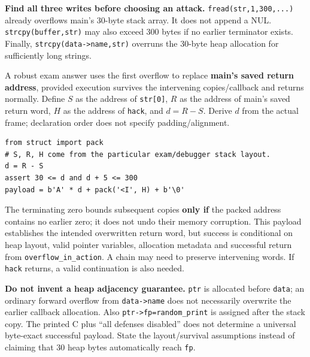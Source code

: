 \documentclass[11pt,a4paper]{article}
\begin{document}
\textbf{Find all three writes before choosing an attack.} \texttt{fread(str,\allowbreak{}1,\allowbreak{}300,\allowbreak{}...)} already overflows main's 30-byte stack array. It does not append a NUL. \texttt{strcpy(buffer,\allowbreak{}str)} may also exceed 300 bytes if no earlier terminator exists. Finally,\allowbreak{} \texttt{strcpy(data->name,\allowbreak{}str)} overruns the 30-byte heap allocation for sufficiently long strings.


A robust exam answer uses the first overflow to replace \textbf{main's saved return address},\allowbreak{} provided execution survives the intervening copies/\allowbreak{}callback and returns normally. Define \(S\) as the address of \texttt{str[0]},\allowbreak{} \(R\) as the address of main's saved return word,\allowbreak{} \(H\) as the address of \texttt{hack},\allowbreak{} and \(d=R-S\). Derive \(d\) from the actual frame; declaration order does not specify padding/\allowbreak{}alignment.



\begin{Verbatim}[breaklines=true,breakanywhere=true,fontsize=\small,frame=single,rulecolor=\color{PanelBorder}]
from struct import pack
# S, R, H come from the particular exam/debugger stack layout.
d = R - S
assert 30 <= d and d + 5 <= 300
payload = b'A' * d + pack('<I', H) + b'\0'
\end{Verbatim}

The terminating zero bounds subsequent copies \textbf{only if} the packed address contains no earlier zero; it does not undo their memory corruption. This payload establishes the intended overwritten return word,\allowbreak{} but success is conditional on heap layout,\allowbreak{} valid pointer variables,\allowbreak{} allocation metadata and successful return from \texttt{overflow\_in\_action}. A chain may need to preserve intervening words. If \texttt{hack} returns,\allowbreak{} a valid continuation is also needed.


\textbf{Do not invent a heap adjacency guarantee.} \texttt{ptr} is allocated before \texttt{data}; an ordinary forward overflow from \texttt{data->name} does not necessarily overwrite the earlier callback allocation. Also \texttt{ptr->fp=\allowbreak{}random\_print} is assigned after the stack copy. The printed C plus “all defenses disabled” does not determine a universal byte-exact successful payload. State the layout/\allowbreak{}survival assumptions instead of claiming that 30 heap bytes automatically reach \texttt{fp}.
\end{document}
